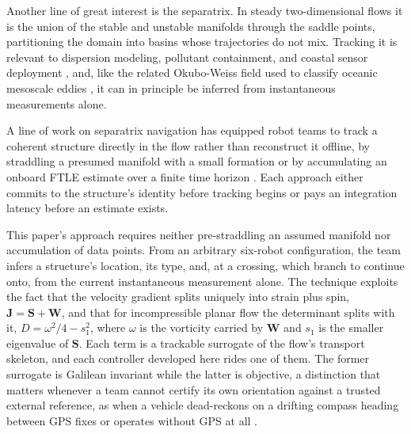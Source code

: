 \documentclass[lettersize,journal]{IEEEtran}
\begin{document}
Another line of great interest is the separatrix. In steady
two-dimensional flows it is the union of the stable and unstable
manifolds through the saddle points, partitioning the domain into
basins whose trajectories do not mix. Tracking it is relevant to
dispersion modeling, pollutant containment, and coastal sensor
deployment \cite{13,14,15}, and, like the related Okubo-Weiss field used
to classify oceanic mesoscale eddies \cite{16}, it can in principle be
inferred from instantaneous measurements alone.

A line of work on separatrix navigation has equipped robot teams to
track a coherent structure directly in the flow rather than
reconstruct it offline, by straddling a presumed manifold with a small
formation \cite{17,18,19,20} or by accumulating an onboard FTLE
estimate over a finite time horizon \cite{21}. Each approach either
commits to the structure's identity before tracking begins or pays an
integration latency before an estimate exists.

This paper's approach requires neither pre-straddling an assumed
manifold nor accumulation of data points. From an arbitrary six-robot
configuration, the team infers a structure's location, its type, and,
at a crossing, which branch to continue onto, from the current
instantaneous measurement alone. The technique exploits the fact that
the velocity gradient splits uniquely into strain plus spin,
$\mathbf{J} = \mathbf{S} + \mathbf{W}$, and that for incompressible
planar flow the determinant splits with it, $D = \omega^2/4 - s_1^2$,
where $\omega$ is the vorticity carried by $\mathbf{W}$ and $s_1$ is the
smaller eigenvalue of $\mathbf{S}$.
Each term is a trackable surrogate of the flow's transport skeleton,
and each controller developed here rides one of them. The former surrogate
is Galilean invariant while the latter is objective, a distinction that
matters whenever a team cannot certify its own orientation against a
trusted external reference, as when a vehicle dead-reckons on a drifting
compass heading between GPS fixes or operates without GPS at all
\cite{22,23}.
\end{document}
